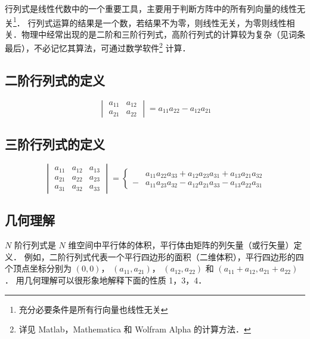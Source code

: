 
行列式是线性代数中的一个重要工具，主要用于判断方阵中的所有列向量的线性无关\footnote{充分必要条件是所有行向量也线性无关}．%
行列式运算的结果是一个数，若结果不为零，则线性无关，为零则线性相关．物理中经常出现的是二阶和三阶行列式，高阶行列式的计算较为复杂（见词条最后），不必记忆其算法，可通过数学软件\footnote{详见 Matlab，Mathematica 和 Wolfram Alpha 的计算方法．} %
计算． 

\subsection{二阶行列式的定义}
\begin{equation}\label{Deter_eq1}
\begin{vmatrix}
a_{11} & a_{12} \\
a_{21} & a_{22}
\end{vmatrix} = a_{11}a_{22} - a_{12}a_{21}
\end{equation}

\subsection{三阶行列式的定义}
\begin{equation}\label{Deter_eq2}
\begin{vmatrix}
a_{11} & a_{12} & a_{13} \\
a_{21} & a_{22} & a_{23} \\
a_{31} & a_{32} & a_{33}
\end{vmatrix}
= \left\{ \begin{aligned}
&a_{11}a_{22}a_{33} + a_{12}a_{23}a_{31} + a_{13}a_{21}a_{32} \\
- &a_{11}a_{23}a_{32} - a_{12}a_{21}a_{33} - a_{13}a_{22}a_{31}
\end{aligned} \right.
\end{equation}

\subsection{几何理解}
$N$ 阶行列式是 $N$ 维空间中平行体的体积，平行体由矩阵的列矢量（或行矢量）定义． 例如，二阶行列式代表一个平行四边形的面积（二维体积），平行四边形的四个顶点坐标分别为 $(0,0)$，  $(a_{11},a_{21})$，  $(a_{12},a_{22})$ 和 $(a_{11}+a_{12}, a_{21}+a_{22})$． 用几何理解可以很形象地解释下面的性质 1，3，4．


